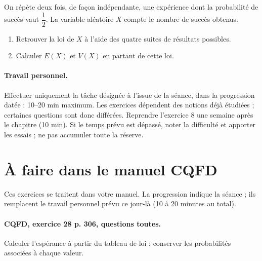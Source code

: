 On répète deux fois, de façon indépendante, une expérience dont la probabilité de succès vaut $\dfrac12$. La variable aléatoire $X$ compte le nombre de succès obtenus.
\begin{enumerate}[label=\arabic*.]
\item Retrouver la loi de $X$ à l’aide des quatre suites de résultats possibles.
\item Calculer $E(X)$ et $V(X)$ en partant de cette loi.
\end{enumerate}
\paragraph{Travail personnel.} Effectuer uniquement la tâche désignée à l’issue de la séance, dans la progression datée : 10–20 min maximum. Les exercices dépendent des notions déjà étudiées ; certaines questions sont donc différées. Reprendre l’exercice 8 une semaine après le chapitre (10 min). Si le temps prévu est dépassé, noter la difficulté et apporter les essais ; ne pas accumuler toute la réserve.
\endgroup
{}\section*{À faire dans le manuel CQFD}
Ces exercices se traitent dans votre manuel. La progression indique la séance ; ils remplacent le travail personnel prévu ce jour-là (10 à 20 minutes au total).
\paragraph{CQFD, exercice 28 p. 306, questions toutes.}\label{C08-M1} Calculer l’espérance à partir du tableau de loi ; conserver les probabilités associées à chaque valeur.
